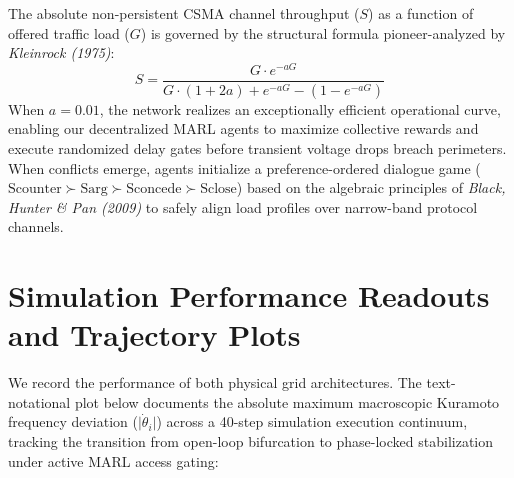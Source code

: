 \documentclass[11pt,fleqn]{article}
\begin{document}
The absolute non-persistent CSMA channel throughput ($S$) as a function of offered traffic load ($G$) is governed by the structural formula pioneer-analyzed by \textit{Kleinrock (1975)}:
\begin{equation}
S = \frac{G \cdot e^{-aG}}{G \cdot (1 + 2a) + e^{-aG} - (1 - e^{-aG})}
\end{equation}
When $a = 0.01$, the network realizes an exceptionally efficient operational curve, enabling our decentralized MARL agents to maximize collective rewards and execute randomized delay gates before transient voltage drops breach perimeters. When conflicts emerge, agents initialize a preference-ordered dialogue game ($\text{Scounter} \succ \text{Sarg} \succ \text{Sconcede} \succ \text{Sclose}$) based on the algebraic principles of \textit{Black, Hunter \& Pan (2009)} to safely align load profiles over narrow-band protocol channels.

\section{Simulation Performance Readouts and Trajectory Plots}
We record the performance of both physical grid architectures. The text-notational plot below documents the absolute maximum macroscopic Kuramoto frequency deviation ($\vert\dot{\theta}_i\vert$) across a 40-step simulation execution continuum, tracking the transition from open-loop bifurcation to phase-locked stabilization under active MARL access gating:
\end{document}
